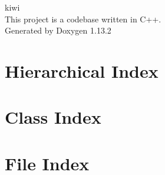 \documentclass[twoside]{book}
\newcommand{\+}{\discretionary{\mbox{\scriptsize$\hookleftarrow$}}{}{}}
\newcommand{\clearemptydoublepage}{%
    \newpage{\pagestyle{empty}\cleardoublepage}%
  }
\begin{document}
  \raggedbottom
    \hypersetup{pageanchor=false,
                bookmarksnumbered=true,
                pdfencoding=unicode
               }
  \begin{titlepage}
  \vspace*{7cm}
  \begin{center}%
  {\Large kiwi}\\
  [1ex]\large This project is a codebase written in C++. \\
  \vspace*{1cm}
  {\large Generated by Doxygen 1.13.2}\\
  \end{center}
  \end{titlepage}
  \clearemptydoublepage
  \tableofcontents
  \clearemptydoublepage
  \hypersetup{pageanchor=true}
\chapter{Hierarchical Index}

\chapter{Class Index}

\chapter{File Index}

\end{document}
